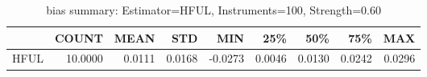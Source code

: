 \begin{table}[ht]
\centering
\caption{bias summary: Estimator=HFUL, Instruments=100, Strength=0.60}
\begin{tabular}{lrrrrrrrr}
\toprule
 & COUNT & MEAN & STD & MIN & 25\% & 50\% & 75\% & MAX \\
\midrule
HFUL & 10.0000 & 0.0111 & 0.0168 & -0.0273 & 0.0046 & 0.0130 & 0.0242 & 0.0296 \\
\bottomrule
\end{tabular}
\end{table}
